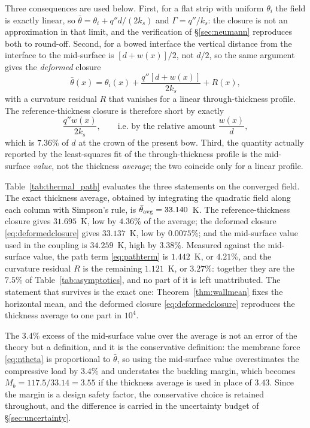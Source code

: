 \documentclass[11pt,a4paper]{article}
\begin{document}
Three consequences are used below. First, for a flat strip with uniform $\theta_i$ the field is
exactly linear, so $\bar\theta=\theta_i+q''d/(2k_s)$ and $\Gamma=q''/k_s$: the closure is not an
approximation in that limit, and the verification of \S\ref{sec:neumann} reproduces both to
round-off. Second, for a bowed interface the vertical distance from the interface to the
mid-surface is $[d+w(x)]/2$, not $d/2$, so the same argument gives the \emph{deformed}
closure
\begin{equation}
\bar\theta(x)=\theta_i(x)+\frac{q''[d+w(x)]}{2k_s}+R(x),
\label{eq:deformedclosure}
\end{equation}
with a curvature residual $R$ that vanishes for a linear through-thickness profile. The
reference-thickness closure is therefore short by exactly
\begin{equation}
\frac{q''w(x)}{2k_s},\qquad\text{i.e. by the relative amount }\frac{w(x)}{d},
\label{eq:pathterm}
\end{equation}
which is $7.36\%$ of $d$ at the crown of the present bow. Third, the quantity actually
reported by the least-squares fit of the through-thickness profile is the mid-surface
\emph{value}, not the thickness \emph{average}; the two coincide only for a linear profile.

Table~\ref{tab:thermal_path} evaluates the three statements on the converged field. The exact
thickness average, obtained by integrating the quadratic field along each column with Simpson's
rule, is $\bar\theta_{\rm avg}=33.140$~K. The reference-thickness closure gives $31.695$~K, low
by $4.36\%$ of the average; the deformed closure \eqref{eq:deformedclosure} gives $33.137$~K,
low by $0.0075\%$; and the mid-surface value used in the coupling is $34.259$~K, high by
$3.38\%$. Measured against the mid-surface value, the path term \eqref{eq:pathterm} is
$1.442$~K, or $4.21\%$, and the curvature residual $R$ is the remaining $1.121$~K, or $3.27\%$:
together they are the $7.5\%$ of Table~\ref{tab:asymptotics}, and no part of it is left
unattributed. The statement that survives is the exact one:
Theorem~\ref{thm:wallmean} fixes the horizontal mean, and the deformed closure
\eqref{eq:deformedclosure} reproduces the thickness average to one part in $10^{4}$.

The $3.4\%$ excess of the mid-surface value over the average is not an error of the theory but a
definition, and it is the conservative definition: the membrane force \eqref{eq:ntheta} is
proportional to $\bar\theta$, so using the mid-surface value overestimates the compressive load
by $3.4\%$ and understates the buckling margin, which becomes $M_b=117.5/33.14=3.55$ if the
thickness average is used in place of $3.43$. Since the margin is a design safety factor, the
conservative choice is retained throughout, and the difference is carried in the uncertainty
budget of \S\ref{sec:uncertainty}.
\end{document}
